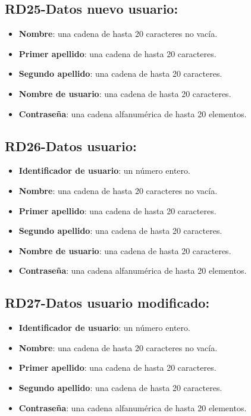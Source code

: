 \documentclass[a4paper,12pt]{report}
\begin{document}
\subsection{RD25-Datos nuevo usuario:}
\label{sec-2-1-25}
\begin{itemize}
\item \textbf{Nombre}: una cadena de hasta 20 caracteres no vacía.
\item \textbf{Primer apellido}: una cadena de hasta 20 caracteres.
\item \textbf{Segundo apellido}: una cadena de hasta 20 caracteres.
\item \textbf{Nombre de usuario}: una cadena de hasta 20 caracteres.
\item \textbf{Contraseña}: una cadena alfanumérica de hasta 20 elementos.
\end{itemize}
\subsection{RD26-Datos usuario:}
\label{sec-2-1-26}
\begin{itemize}
\item \textbf{Identificador de usuario}: un número entero.
\item \textbf{Nombre}: una cadena de hasta 20 caracteres no vacía.
\item \textbf{Primer apellido}: una cadena de hasta 20 caracteres.
\item \textbf{Segundo apellido}: una cadena de hasta 20 caracteres.
\item \textbf{Nombre de usuario}: una cadena de hasta 20 caracteres.
\item \textbf{Contraseña}: una cadena alfanumérica de hasta 20 elementos.
\end{itemize}
\subsection{RD27-Datos usuario modificado:}
\label{sec-2-1-27}
\begin{itemize}
\item \textbf{Identificador de usuario}: un número entero.
\item \textbf{Nombre}: una cadena de hasta 20 caracteres no vacía.
\item \textbf{Primer apellido}: una cadena de hasta 20 caracteres.
\item \textbf{Segundo apellido}: una cadena de hasta 20 caracteres.
\item \textbf{Contraseña}: una cadena alfanumérica de hasta 20 elementos.
\end{itemize}
\end{document}
